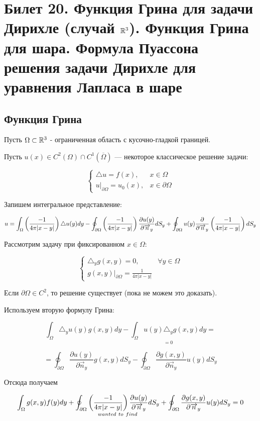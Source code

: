 \section{Билет 20. Функция Грина для задачи Дирихле (случай $\mathbb{R}^3$). Функция Грина для шара. Формула Пуассона решения задачи Дирихле для уравнения Лапласа в шаре}

\subsection{Функция Грина}
Пусть $\Omega \subset \mathbb{R}^3$ - ограниченная область с кусочно-гладкой границей.

Пусть $u(x) \in C^2(\Omega) \cap C^1(\overline{\Omega})$ --- некоторое классическое решение задачи:

\[\begin{cases}
   \triangle u = f(x), & x\in \Omega \\
   u|_{\partial \Omega} = u_0(x), & x \in \partial \Omega  
\end{cases}\]  

Запишем интегральное представление:

$$ u = \int_{\Omega}{\left(\frac{-1}{4 \pi |x-y|}\right)  {\triangle u(y)} dy} - \oint_{\partial \Omega}{\left(\frac{-1}{4 \pi |x-y|}\right) \frac{\partial u(y)}{\partial \overrightarrow{n}_y} d S_y} + 
\oint_{\partial \Omega}{ {u(y)} \frac{\partial}{\partial \overrightarrow{n}_y}\left(\frac{-1}{4 \pi |x-y|}\right)d S_y}
$$

Рассмотрим задачу при фиксированном $x \in \Omega$:

\[\begin{cases}
   \triangle_y g(x,y) = 0, & \forall y \in \Omega \\
   g(x,y)|_{\partial \Omega} = \frac{1}{4 \pi |x-y|}  
\end{cases}\] 

Если $\partial \Omega \in C^2$, то решение существует (пока не можем это доказать).

Используем вторую формулу Грина:

$$ \int_{\Omega}{\triangle_y u(y) g(x,y)dy} - 
{\underset{=0}{\int_{\Omega}{u(y) \triangle_y g(x,y) dy}}}=$$

$$=\oint_{\partial \Omega} {\frac{\partial u(y)}{\partial \overrightarrow{n}_y} g(x,y) dS_y} - \oint_{\partial \Omega} {\frac{\partial g(x,y)}{\partial \overrightarrow{n}_y} u(y) dS_y} $$

Отсюда получаем

$$\int_{\Omega}{g(x,y) f(y) dy} + \underset{wanted~to~find}{\oint_{\partial \Omega}{\left(\frac{-1}{4 \pi |x-y|}\right) \frac{\partial u(y)}{\partial \overrightarrow{n}_y} d S_y}}+ \oint_{\partial \Omega}
{\frac{\partial g(x,y)}{\partial \overrightarrow{n}_y}u(y) dS_y} = 0
$$

